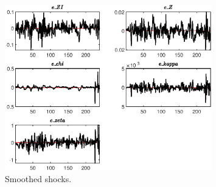  
\begin{figure}[H]
\centering 
\includegraphics[width=0.80\textwidth]{directed_search_est/graphs/directed_search_est_SmoothedShocks1}
\caption{Smoothed shocks.}\label{Fig:SmoothedShocks:1}
\end{figure}


